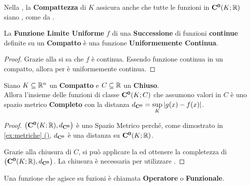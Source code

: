 \begin{observation}
	Nella , la \textbf{Compattezza} di $K$ assicura anche che tutte le funzioni in $\mathbf{C^{0}}(K; \mathbb{R})$ siano , come da .
\end{observation}
\begin{corollary}
	La \textbf{Funzione Limite Uniforme} $f$ di una \textbf{Successione} di funzioni \textbf{continue} definite su un \textbf{Compatto} è una funzione \textbf{Uniformemente Continua}.
	\begin{proof}
		Grazie alla  si sa che $f$ è continua. Essendo funzione continua in un compatto, allora per  è uniformemente continua.
	\end{proof}
\end{corollary}
\begin{corollary}
	\label{prop:compl_dist_spm_compl}
	Siano $K \subseteq \mathbb{R}^n$ un \textbf{Compatto} e $C \subseteq \mathbb{R}$ un \textbf{Chiuso}.\\
	Allora l'insieme delle funzioni di classe $\mathbf{C^{0}}(K; C)$ che assumono valori in $C$ è uno spazio metrico \textbf{Completo} con la distanza $d_{\mathbf{C^{0}}} = \sup\limits_{K} \left|g(x) - f(x)\right|$.
	\begin{proof}
		$\bigl( \mathbf{C^{0}}(K; \mathbb{R}), d_{\mathbf{C^{0}}} \bigr)$ è uno Spazio Metrico perché, come dimostrato in \hyperref[ex:dim_dist_conv_unif]{\cref*{ex:metriche} ()}, $d_{\mathbf{C^{0}}}$ è una distanza su $\mathbf{C^{0}}(K; \mathbb{R})$.

		Grazie alla chiusura di $C$, si può applicare la  ed ottenere la completezza di $\bigl( \mathbf{C^{0}}(K; \mathbb{R}), d_{\mathbf{C^{0}}} \bigr)$. La chiusura è necessaria per utilizzare .
	\end{proof}
\end{corollary}

\begin{definition}[Operatore]
	Una funzione che agisce su fuzioni è chiamata \textbf{Operatore} o \textbf{Funzionale}.
\end{definition}

